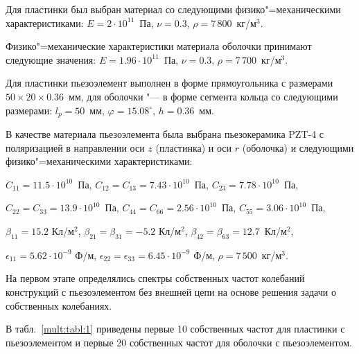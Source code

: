 Для пластинки был выбран материал со следующими физико"=механическими характеристиками: $E=2\cdot10^{11}$~Па, $\nu=0.3$, $\rho=7\,800$~кг/м$^{3}$. 

Физико"=механические характеристики материала оболочки принимают следующие значения: $E=1.96\cdot10^{11}$~Па, $\nu=0.3$, $\rho=7\,700$~кг/м$^{3}$.



Для пластинки пьезоэлемент выполнен в форме прямоугольника с размерами $50\times 20\times 0.36$~мм, для оболочки "--- в форме сегмента кольца со следующими размерами: $l_{p} =50$~мм, $\varphi=15.08^\circ$, $h=0.36$~мм.

В качестве материала пьезоэлемента была выбрана пьезокерамика PZT-4 с поляризацией в направлении оси $z$ (пластинка) и оси $r$ (оболочка) и следующими физико"=механическими характеристиками:

$C_{11}=11.5\cdot10^{10}$~Па, $C_{12}=C_{13}=7.43\cdot10^{10}$~Па, $C_{23}=7.78\cdot10^{10}$~Па,

$C_{22}=C_{33}=13.9\cdot10^{10}$~Па, $C_{44}=C_{66}=2.56\cdot10^{10}$~Па, $C_{55}=3.06\cdot10^{10}$~Па,

$\beta_{11}=15.2$ Кл/м$^2$, $\beta_{21}=\beta_{31}=-5.2$ Кл/м$^2$, $\beta_{42}=\beta_{63}=12.7$~Кл/м$^2$,

$\epsilon_{11}=5.62\cdot10^{-9}$ Ф/м, $\epsilon_{22}=\epsilon_{33}=6.45\cdot10^{-9}$ Ф/м, $\rho=7\,500$~кг/м$^3$.



На первом этапе определялись спектры собственных частот колебаний конструкций с пьезоэлементом без внешней цепи на основе решения задачи о собственных колебаниях.



В табл.~\ref{mult:tabl:1} приведены первые 10 собственных частот для пластинки с пьезоэлементом и первые 20 собственных частот для оболочки с пьезоэлементом.



